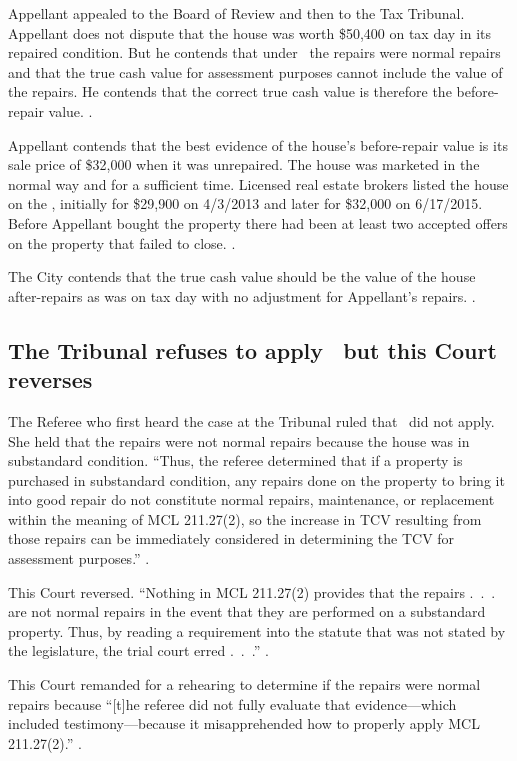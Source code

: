 \documentclass[12pt,\documentclassflag]{michiganCourtOfAppealsBrief}
\begin{document}
Appellant appealed to the Board of Review and then to the Tax Tribunal. Appellant does not dispute that the house was worth \$50,400 on tax day in its repaired condition. But he contends that under \mathieuGast\ the repairs were normal repairs and that the true cash value for assessment purposes cannot include the value of the repairs. He contends that the correct true cash value is therefore the before-repair value. \explanatoryLetter[].

Appellant contends that the best evidence of the house's before-repair value is its sale price of \$32,000 when it was unrepaired. The house was marketed in the normal way and for a sufficient time. Licensed real estate brokers listed the house on the \MLS, initially for \$29,900 on 4/3/2013 and later for \$32,000 on 6/17/2015. Before Appellant bought the property there had been at least two accepted offers on the property that failed to close. \mlsHistory[]. 

The City contends that the true cash value should be the value of the house after-repairs as was on tax day with no adjustment for Appellant's repairs. \cityEvidence.

\subsection{The Tribunal refuses to apply \mathieuGast\ but this Court reverses}

The Referee who first heard the case at the Tribunal ruled that \mathieuGast\ did not apply. She held that the repairs were not normal repairs because the house was in substandard condition. ``Thus, the referee determined that if a property is purchased in substandard condition, any repairs done on the property to bring it into good repair do not constitute normal repairs, maintenance, or replacement within the meaning of MCL 211.27(2), so the increase in TCV resulting from those repairs can be immediately considered in determining the TCV for assessment purposes.'' .

This Court reversed. ``Nothing in MCL 211.27(2) provides that the repairs .~.~. are not normal repairs in the event that they are performed on a substandard property. Thus, by reading a requirement into the statute that was not stated by the legislature, the trial court erred .~.~.'' .

This Court remanded for a rehearing to determine if the repairs were normal repairs because ``[t]he referee did not fully evaluate that evidence---which included testimony---because it misapprehended how to properly apply MCL 211.27(2).'' .
\end{document}
